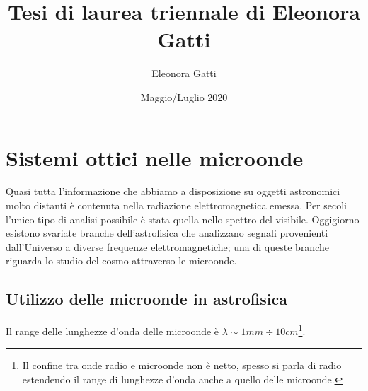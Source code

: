 \documentclass[12pt,a4paper,final]{book}
\title{Tesi di laurea triennale di Eleonora Gatti}
\author{Eleonora Gatti}
\date{Maggio/Luglio 2020}
\begin{document}


\newpage
\thispagestyle{empty}
\clearpage\mbox{}\clearpage
\newpage
\thispagestyle{empty}


\tableofcontents
\newpage


\chapter{Sistemi ottici nelle microonde}\label{intro_sistemi_ottici}
Quasi tutta l'informazione che abbiamo a disposizione su oggetti astronomici molto distanti è contenuta nella radiazione elettromagnetica emessa. Per secoli l'unico tipo di analisi possibile è stata quella nello spettro del visibile. Oggigiorno esistono svariate branche dell'astrofisica che analizzano segnali provenienti dall'Universo a diverse frequenze elettromagnetiche; una di queste branche riguarda lo studio del cosmo attraverso le microonde. 


\section{Utilizzo delle microonde in astrofisica}\label{microonde_astrofisica}
Il range delle lunghezze d'onda delle microonde è $\lambda \sim 1 \unit{mm} \div 10 \unit{cm}$\footnote{Il confine tra onde radio e microonde non è netto, spesso si parla di radio estendendo il range di lunghezze d'onda anche a quello delle microonde.}.
\end{document}
